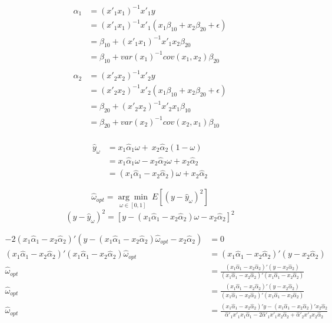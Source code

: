 \documentclass{monashthesis}
\begin{document}
\begin{align*}
    \hat\alpha_{1} &= (x'_1x_1)^{-1} x'_1y \\
    &= (x'_1x_1)^{-1} x'_1(x_1 \beta_{10} + x_2 \beta_{20} + \epsilon) \\
    &= \beta_{10} + (x'_1x_1)^{-1} x'_1x_2 \beta_{20} \\
    &= \beta_{10} + var(x_1)^{-1} cov(x_1,x_2) \beta_{20} \\
\end{align*}
\begin{align*}
    \hat\alpha_{2} &= (x'_2x_2)^{-1} x'_2y \\
    &= (x'_2x_2)^{-1} x'_2(x_1 \beta_{10} + x_2 \beta_{20} + \epsilon) \\
    &= \beta_{20} + (x'_2x_2)^{-1} x'_2x_1 \beta_{10} \\
    &= \beta_{20} + var(x_2)^{-1} cov(x_2,x_1) \beta_{10} \\
\end{align*}

\begin{align*}
    \hat y_{\omega} &= x_1 \hat\alpha_1 \omega + \ x_2 \hat\alpha_2 (1-\omega) \\
    &= x_1 \hat\alpha_1 \omega - x_2 \hat\alpha_2 \omega + x_2 \hat\alpha_2 \\
    &= (x_1 \hat\alpha_1 - x_2 \hat\alpha_2) \omega + x_2 \hat\alpha_2 
\end{align*}

\newpage

\[ \hat\omega_{opt} =  \underset{\omega \in [0,1]}{\arg\min} \ E[(y-\hat y_{\omega})^2] \]
\[(y-\hat y_{\omega})^2 = [y-(x_1 \hat\alpha_1 - x_2 \hat\alpha_2) \omega - x_2 \hat\alpha_2]^2\]

\begin{align*}
    -2(x_1 \hat\alpha_1 - x_2 \hat\alpha_2)' (y-(x_1 \hat\alpha_1 - x_2 \hat\alpha_2) \hat\omega_{opt} - x_2 \hat\alpha_2) &= 0 \\
    (x_1 \hat\alpha_1 - x_2 \hat\alpha_2)' (x_1 \hat\alpha_1 - x_2 \hat\alpha_2) \hat\omega_{opt} &= (x_1 \hat\alpha_1 - x_2 \hat\alpha_2)' (y - x_2 \hat\alpha_2) \\
    \hat\omega_{opt} &= \frac{(x_1 \hat\alpha_1 - x_2 \hat\alpha_2)' (y - x_2 \hat\alpha_2)}{(x_1 \hat\alpha_1 - x_2 \hat\alpha_2)' (x_1 \hat\alpha_1 - x_2 \hat\alpha_2)} \\
    \hat\omega_{opt} &= \frac{(x_1 \hat\alpha_1 - x_2 \hat\alpha_2)' (y - x_2 \hat\alpha_2)}{(x_1 \hat\alpha_1 - x_2 \hat\alpha_2)' (x_1 \hat\alpha_1 - x_2 \hat\alpha_2)} \\
    \hat\omega_{opt} &= \frac{(x_1 \hat\alpha_1 - x_2 \hat\alpha_2)' y - (x_1 \hat\alpha_1 - x_2 \hat\alpha_2)' x_2 \hat\alpha_2}{\hat\alpha'_1 x'_1 x_1 \hat\alpha_1 - 2\hat\alpha'_1 x'_1 x_2 \hat\alpha_2 + \hat\alpha'_2 x'_2 x_2 \hat\alpha_2} \\
\end{align*}
\end{document}

